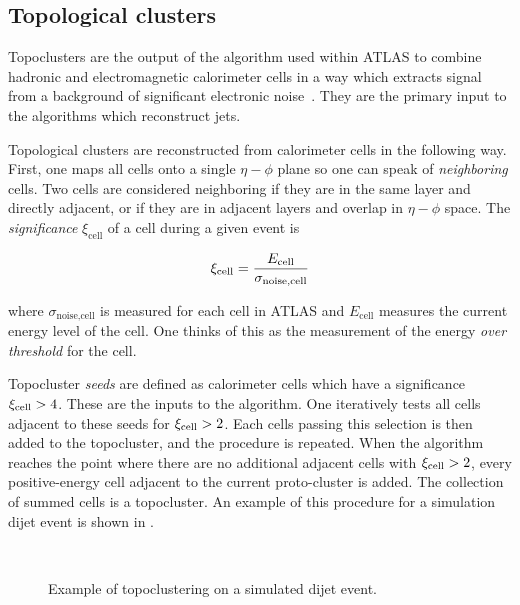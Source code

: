 \subsection{Topological clusters}\label{sec:topoclusters}

Topoclusters are the output of the algorithm used within ATLAS to combine hadronic and electromagnetic calorimeter cells in a way which extracts signal from a background of significant electronic noise~\cite{PERF-2014-07}.
They are the primary input to the algorithms which reconstruct jets.

Topological clusters are reconstructed from calorimeter cells in the following way.
First, one maps all cells onto a single $\eta-\phi$ plane so one can speak of \textit{neighboring} cells.
Two cells are considered neighboring if they are in the same layer and directly adjacent, or if they are in adjacent layers and overlap in $\eta-\phi$ space.
The \textit{significance} $\xi_{\text{cell}}$ of a cell during a given event is

\begin{equation}
\xi_{\text{cell}} = \frac{E_{\text{cell}}}{\sigma_{\text{noise,cell}}}
\end{equation}

where $\sigma_{\text{noise,cell}}$ is measured for each cell in ATLAS and $E_{\text{cell}}$ measures the current energy level of the cell.
One thinks of this as the measurement of the energy \textit{over threshold} for the cell.

Topocluster \textit{seeds} are defined as calorimeter cells which have a significance $\xi_{\text{cell}} > 4 $.
These are the inputs to the algorithm.
One iteratively tests all cells adjacent to these seeds for $\xi_{\text{cell}} > 2$.
Each cells passing this selection is then added to the topocluster, and the procedure is repeated.
When the algorithm reaches the point where there are no additional adjacent cells with $\xi_{\text{cell}} > 2$, every positive-energy cell adjacent to the current proto-cluster is added.
The collection of summed cells is a topocluster.
An example of this procedure for a simulation dijet event is shown in .
\begin{figure}
\caption{Example of topoclustering on a simulated dijet event.} \label{fig:topocluster}
 \\
\end{figure}

